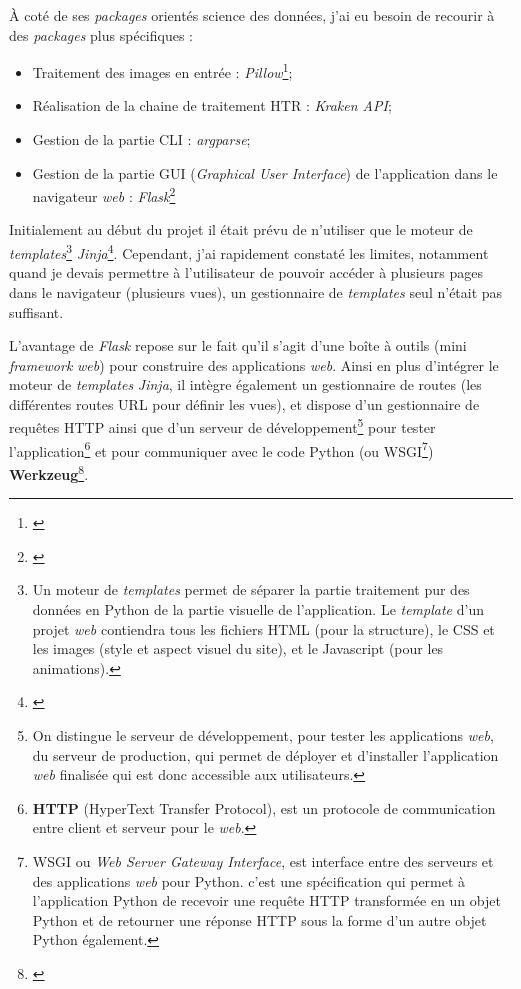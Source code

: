 À coté de ses \textit{packages} orientés science des données, j'ai eu besoin de recourir à des \textit{packages} plus spécifiques : 

\begin{itemize}
    \item Traitement des images en entrée : \textit{Pillow}\footnote{\cite{noauthor_pillow_nodate}};
    \item Réalisation de la chaine de traitement HTR : \textit{Kraken API};
    \item Gestion de la partie CLI : \textit{argparse};
    \item Gestion de la partie GUI (\textit{Graphical User Interface}) de l'application dans le navigateur \textit{web} : \textit{Flask}\footnote{\cite{noauthor_flask_nodate}}
\end{itemize}

Initialement au début du projet il était prévu de n'utiliser que le moteur de \textit{templates}\footnote{Un moteur de \textit{templates} permet de séparer la partie traitement pur des données en Python de la partie visuelle de l'application. Le \textit{template} d'un projet \textit{web} contiendra tous les fichiers HTML (pour la structure), le CSS et les images (style et aspect visuel du site), et le Javascript (pour les animations).} \textit{Jinja}\footnote{\cite{noauthor_jinja_nodate}}. Cependant, j'ai rapidement constaté les limites, notamment quand je devais permettre à l'utilisateur de pouvoir accéder à plusieurs pages dans le navigateur (plusieurs vues), un gestionnaire de \textit{templates} seul n'était pas suffisant. 

L'avantage de \textit{Flask} repose sur le fait qu'il s'agit d'une boîte à outils (mini \textit{framework} \textit{web}) pour construire des applications \textit{web}. Ainsi en plus d'intégrer le moteur de \textit{templates} \textit{Jinja}, il intègre également un gestionnaire de routes (les différentes routes URL pour définir les vues), et dispose d'un gestionnaire de requêtes HTTP ainsi que d'un serveur de développement\footnote{On distingue le serveur de développement, pour tester les applications \textit{web}, du serveur de production, qui permet de déployer et d'installer l'application \textit{web} finalisée qui est donc accessible aux utilisateurs.} pour tester l'application\footnote{\textbf{HTTP} (HyperText Transfer Protocol), est un protocole de communication entre client et serveur pour le \textit{web}.} et pour communiquer avec le code Python (ou WSGI\footnote{WSGI ou \textit{Web Server Gateway Interface}, est interface entre des serveurs et des applications \textit{web} pour Python. c'est une spécification qui permet à l'application Python de recevoir une requête HTTP transformée en un objet Python et de retourner une réponse HTTP sous la forme d’un autre objet Python également.}) \textbf{Werkzeug}\footnote{\cite{noauthor_werkzeug_nodate}}.\\

